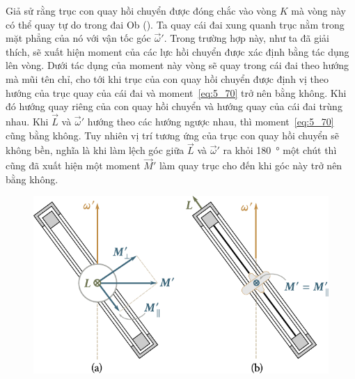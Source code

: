 Giả sử rằng trục con quay hồi chuyển được đóng chắc vào vòng $K$ mà vòng này có thể quay tự do trong đai Ob (). Ta quay cái đai xung quanh trục nằm trong mặt phẳng của nó với vận tốc góc $\vec{\omega}'$. Trong trường hợp này, như ta đã giải thích, sẽ xuất hiện moment của các lực hồi chuyển được xác định bằng  tác dụng lên vòng. Dưới tác dụng của moment này vòng sẽ quay trong cái đai theo hướng mà mũi tên chỉ, cho tới khi trục của con quay hồi chuyển được định vị theo hướng của trục quay của cái đai và moment~\eqref{eq:5_70} trở nên bằng không. Khi đó hướng quay riêng của con quay hồi chuyển và hướng quay của cái đai trùng nhau. Khi $\vec{L}$ và $\vec{\omega}'$ hướng theo các hướng ngược nhau, thì moment~\eqref{eq:5_70} cũng bằng không. Tuy nhiên vị trí tương ứng của trục con quay hồi chuyển sẽ không bền, nghĩa là khi làm lệch góc giữa $\vec{L}$ và $\vec{\omega}'$ ra khỏi \SI{180}{\degree} một chút thì cũng đã xuất hiện một moment $\vec{M}'$ làm quay trục cho đến khi góc này trở nên bằng không.

\begin{figure}[!htb]
	\begin{center}
		\includegraphics[scale=0.95]{figures/ch_05/fig_5_27.pdf}
		\caption[]{}
		\label{fig:5_27}
	\end{center}
\end{figure}

